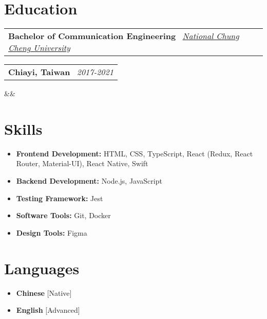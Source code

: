 \documentclass[11pt,a4paper,sans]{moderncv}
\makeatletter
\newcommand*{\customcventry}[7][.13em]{
\begin{tabular}{@{}l}
{\bfseries #4} \
{\itshape #3}
\end{tabular}
\hfill
\begin{tabular}{l@{}}
{\bfseries #5} \
{\itshape #2}
\end{tabular}
\ifx&#7&%
\else{\
\begin{minipage}{\maincolumnwidth}%
\small#7%
\end{minipage}}\fi%
\par\addvspace{#1}}
\makeatother
\begin{document}
\section{Education}

\customcventry{2017-2021}{\color{blue}\href{https://www.ccu.edu.tw/}{National Chung Cheng University}}{Bachelor of Communication Engineering}{Chiayi, Taiwan}{}{}

\section{Skills}

\begin{itemize}[label=\textbullet]
  \item \textbf{Frontend Development:} HTML, CSS, TypeScript, React (Redux, React Router, Material-UI), React Native, Swift
  \item \textbf{Backend Development:} Node.js, JavaScript
  \item \textbf{Testing Framework:} Jest
  \item \textbf{Software Tools:} Git, Docker
  \item \textbf{Design Tools:} Figma
\end{itemize}

\section{Languages}

\begin{multicols}{2}
  \begin{itemize}[label=\textbullet]
    \item \textbf{Chinese} [Native]
    \item \textbf{English} [Advanced]
  \end{itemize}
\end{multicols}
\end{document}
